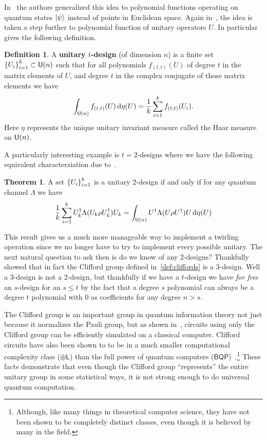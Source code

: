 \documentclass[11pt,english]{article}
\theoremstyle{definition}
\newtheorem{definition}{Definition}[section]
\newtheorem{theorem}{Theorem}[section]
\begin{document}
In~\cite{state-designs} the authors generalized this idea to polynomial functions operating on quantum states $\ket{\psi}$ instead of points in Euclidean space.
Again in~\cite{exact-approx-designs}, the idea is taken a step further to polynomial function of unitary operators $U$.
In particular~\cite{exact-approx-designs} gives the following definition.
\begin{definition}
  A \textbf{unitary $t$-design} (of dimension $n$) is a finite set $\qty{U_i}_{i = 1}^k\subset\mathsf{U}(n)$ such that for all polynomials $f_{(t, t)}(U)$ of degree $t$ in the matrix elements of $U$, and degree $t$ in the complex conjugate of those matrix elements we have
  \begin{equation}
    \int_{\mathsf{U}(n)}f_{(t,t)}(U)\dd{\eta(U)} = \frac{1}{k}\sum_{i = 1}^k f_{(t,t)}(U_i).
  \end{equation}
  Here $\eta$ represents the unique unitary invariant measure called the Haar measure on $\mathsf{U}(n)$.
\end{definition}

A particularly interesting example is $t=2$-designs where we have the following equivalent characterziation due to~\cite{even-unitaries}.
\begin{theorem}
  A set $\qty{U_i}_{i=1}^k$ is a unitary 2-design if and only if for any quantum channel $\Lambda$ we have
  \begin{equation}
    \frac{1}{k}\sum_{i=1}^k U_k^\dagger \Lambda(U_k\rho U_k^\dagger)U_k = \int_{\mathsf{U}(n)}U^\dagger\Lambda(U\rho U^\dagger)U\dd{\eta(U)}
  \end{equation}
\end{theorem}
This result gives us a much more manageable way to implement a twirling operation since we no longer have to try to implement every possible unitary.
The next natural question to ask then is do we know of any 2-designs?
Thankfully~\cite{cliffords} showed that in fact the Clifford group defined in~\cref{def:cliffords} is a 3-design.
Well a 3-design is not a 2-design, but thankfully if we have a $t$-design we have \emph{for free} an $s$-design for an $s\leq t$ by the fact that a degree $s$ polynomial can always be a degree $t$ polynomial with 0 as coefficients for any degree $n > s$.

The Clifford group is an important group in quantum information theory not just because it normalizes the Pauli group, but as shown in~\cite{gottesman-knill}, circuits using only the Clifford group can be efficiently simulated on a classical computer.
Clifford circuits have also been shown to to be in a much smaller computational complexity class ($\oplus\mathsf{L}$) than the full power of quantum computers ($\mathsf{BQP}$)~\cite{aaronson}.\footnote{Although, like many things in theoretical computer science, they have not been shown to be completely distinct classes, even though it is believed by many in the field.}
These facts demonstrate that even though the Clifford group ``represents'' the entire unitary group in some statistical ways, it is not strong enough to do universal quantum computation.

\clearpage


\end{document}
